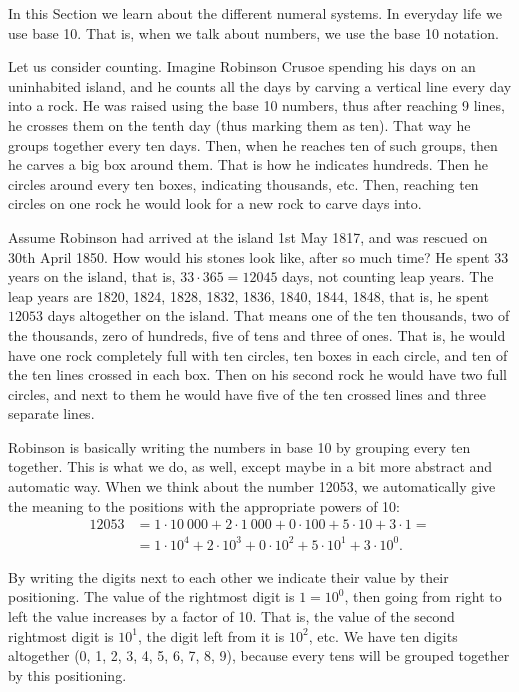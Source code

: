 In this Section we learn about the different numeral systems. 
In everyday life we use base 10. 
That is, 
when we talk about numbers, 
we use the base 10 notation. 

Let us consider counting. 
Imagine Robinson Crusoe spending his days on an uninhabited island, 
and he counts all the days by carving a vertical line every day into a rock. 
He was raised using the base 10 numbers, 
thus after reaching 9 lines, 
he crosses them on the tenth day (thus marking them as ten). 
That way he groups together every ten days. 
Then, when he reaches ten of such groups, 
then he carves a big box around them. 
That is how he indicates hundreds. 
Then he circles around every ten boxes, 
indicating thousands, etc. 
Then, reaching ten circles on one rock he would look for a new rock to carve days into. 

Assume Robinson had arrived at the island 1st May 1817, 
and was rescued on 30th April 1850. 
How would his stones look like, 
after so much time?
He spent 33 years on the island, 
that is, $33 \cdot 365 = 12045$ days, not counting leap years. 
The leap years are 1820, 1824, 1828, 1832, 1836, 1840, 1844, 1848, 
that is, he spent $12053$ days altogether on the island. 
That means one of the ten thousands, 
two of the thousands, zero of hundreds, five of tens and three of ones. 
That is, he would have one rock completely full with ten circles, 
ten boxes in each circle, 
and ten of the ten lines crossed in each box. 
Then on his second rock he would have two full circles, 
and next to them he would have five of the ten crossed lines and three separate lines. 

Robinson is basically writing the numbers in base 10 by grouping every ten together. 
This is what we do, as well, 
except maybe in a bit more abstract and automatic way. 
When we think about the number 12053, 
we automatically give the meaning to the positions with the appropriate powers of 10: 
\begin{align*}
12053 &= 1 \cdot 10~000 + 2 \cdot 1~000 + 0 \cdot 100 + 5 \cdot 10 + 3 \cdot 1 = \\
&= 1 \cdot 10^4 + 2 \cdot 10^3 + 0 \cdot 10^2 + 5 \cdot 10^1 + 3 \cdot 10^0. 
\end{align*}

By writing the digits next to each other we indicate their value by their positioning. 
The value of the rightmost digit is $1 = 10^0$, 
then going from right to left the value increases by a factor of 10. 
That is, the value of the second rightmost digit is $10^1$, 
the digit left from it is $10^2$, etc. 
We have ten digits altogether (0, 1, 2, 3, 4, 5, 6, 7, 8, 9), 
because every tens will be grouped together by this positioning. 

